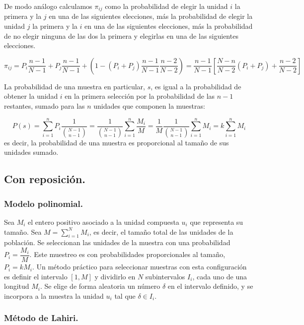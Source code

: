 De modo an\'alogo calculamos $\pi_{ij}$ como la probabilidad de elegir
la unidad $i$ la primera y la $j$ en una de las siguientes elecciones,
m\'as la probabilidad de elegir la unidad $j$ la primera y la $i$
en una de las siguientes elecciones, m\'as la probabilidad de no elegir
ninguna de las dos la primera y elegirlas en una de las siguientes
elecciones.

\[
\pi_{ij}=P_{i}\dfrac{n-1}{N-1}+P_{j}\dfrac{n-1}{N-1}+\left(1-\left(P_{i}+P_{j}\right)\dfrac{n-1}{N-1}\dfrac{n-2}{N-2}\right)=\dfrac{n-1}{N-1}\left[\dfrac{N-n}{N-2}\left(P_{i}+P_{j}\right)+\dfrac{n-2}{N-2}\right]
\]


La probabilidad de una muestra en particular, $s$, es igual a la
probabilidad de obtener la unidad $i$ en la primera selecci\'on por
la probabilidad de las $n-1$ restantes, sumado para las $n$ unidades
que componen la muestras:

\[
P\left(s\right)=\sum_{i=1}^{n}P_{i}\dfrac{1}{\binom{N-1}{n-1}}=\dfrac{1}{\binom{N-1}{n-1}}\sum_{i=1}^{n}\dfrac{M_{i}}{M}=\dfrac{1}{M}\dfrac{1}{\binom{N-1}{n-1}}\sum_{i=1}^{n}M_{i}=k\sum_{i=1}^{n}M_{i}
\]
 es decir, la probabilidad de una muestra es proporcional al tama\~no
de sus unidades sumado.


\subsection{Con reposici\'on.}


\subsubsection{Modelo polinomial.}

Sea $M_{i}$ el entero positivo asociado a la unidad compuesta $u_{i}$
que representa su tama\~no. Sea $M=\sum_{i=1}^{N}M_{i}$, es decir,
el tama\~no total de las unidades de la poblaci\'on. Se seleccionan las
unidades de la muestra con una probabilidad $P_{i}=\dfrac{M_{i}}{M}$.
Este muestreo es con probabilidades proporcionales al tama\~no, $P_{i}=kM_{i}$.
Un m\'etodo pr\'actico para seleccionar muestras con esta configuraci\'on
es definir el intervalo $\left[1,M\right]$ y dividirlo en $N$ subintervalos
$I_{i}$, cada uno de una longitud $M_{i}$. Se elige de forma aleatoria
un n\'umero $\delta$ en el intervalo definido, y se incorpora a la
muestra la unidad $u_{i}$ tal que $\delta\in I_{i}$.


\subsubsection{M\'etodo de Lahiri.}


